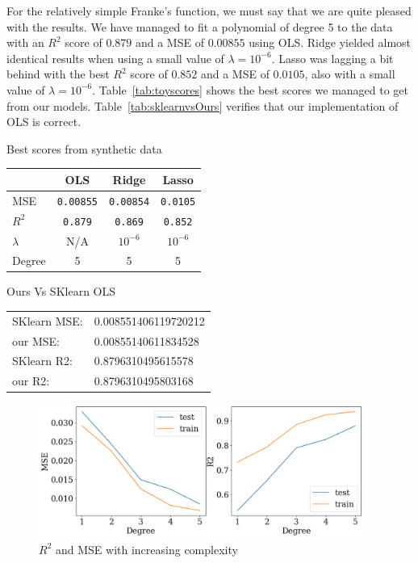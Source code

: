 \documentclass[twoside,11pt]{report}
\begin{document}
For the relatively simple Franke's function, we must say that we are quite pleased with the results.
We have managed to fit a polynomial of degree 5 to the data with an $R^2$ score of $0.879$ and a MSE of $0.00855$ 
using OLS. Ridge yielded almost identical results  when using a small value of $\lambda = 10^{-6}$.
Lasso was lagging a bit behind with the best $R^2$ score of $0.852$ and a MSE of $0.0105$, 
also with a small value of $\lambda = 10^{-6}$. Table~\ref{tab:toyscores} shows the best scores we managed to get from our models. 
Table~\ref{tab:sklearnvsOurs} verifies that our implementation of OLS is correct.\\
\begin{mytable}[float=!h,label=tab:toyscores, width=0.5\textwidth]{Best scores from synthetic data}
\centering
\begin{tabular}{l|c|c|c}
    & OLS & Ridge & Lasso \\
    \hline
    MSE  &   \texttt{0.00855} & \texttt{0.00854} & \texttt{0.0105} \\
    $R^2$     &   \texttt{0.879} & \texttt{0.869} & \texttt{0.852} \\
    $\lambda$ &  N/A  & $10^{-6}$ & $10^{-6}$ \\
    Degree & 5 & 5 & 5
\end{tabular}%
\end{mytable}

\begin{mytable}[float=h,label=tab:sklearnvsOurs, width=.5\textwidth]{Ours Vs SKlearn OLS}
\centering
\begin{tabular}{l l}
    SKlearn MSE: & 0.008551406119720212\\
    our MSE: & 0.00855140611834528\\
    SKlearn R2:&  0.8796310495615578\\
    our R2:&  0.8796310495803168
\end{tabular}%
\end{mytable}
\begin{figure}[!h]
    \begin{center}
        \includegraphics[width=0.95\textwidth]{../runsAndAdditions/R2andMSEOLS.png}
    \end{center}
    \caption{$R^2$ and MSE with increasing complexity}\label{fig:R2andMSEOLS}
\end{figure}
\end{document}
